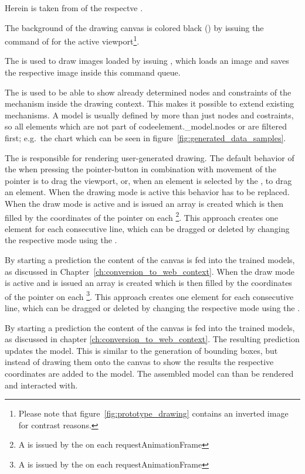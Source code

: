Herein  is taken from  of the respectve  .

The background of the drawing canvas is colored black () by issuing the  command of  for the active viewport\footnote{Please note that figure~\ref{fig:prototype_drawing} contains an inverted image for contrast reasons.}.

The  is used to draw images loaded by issuing , which loads an image and saves the respective image inside this command queue.

The  is used to be able to show already determined nodes and constraints of the mechanism inside the drawing context.
This makes it possible to extend existing mechanisms.
A  model is usually defined by more than just nodes and costraints, so all elements which are not part of code{element.\_model.nodes} or  are filtered first; e.g.\ the chart which can be seen in figure~\ref{fig:generated_data_samples}.

The  is responsible for rendering user-generated drawing.
The default behavior of the  when pressing the pointer-button in combination with movement of the pointer is to drag the viewport, or, when an element is selected by the , to drag an element.
When the drawing mode is active this behavior has to be replaced.
When the draw mode is active and  is issued an array is created which is then filled by the coordinates of the pointer on each \footnote{A  is issued by the  on each requestAnimationFrame}.
This approach creates one  element for each consecutive line, which can be dragged or deleted by changing the respective mode using the  .

By starting a prediction the content of the canvas is fed into the trained models, as discussed in Chapter~\ref{ch:conversion_to_web_context}.
When the draw mode is active and  is issued an array is created which is then filled by the coordinates of the pointer on each \footnote{A  is issued by the  on each requestAnimationFrame}.
This approach creates one  element for each consecutive line, which can be dragged or deleted by changing the respective mode using the  .

By starting a prediction the content of the canvas is fed into the trained models, as discussed in chapter \ref{ch:conversion_to_web_context}.
The resulting prediction updates the  model.
This is similar to the generation of bounding boxes, but instead of drawing them onto the canvas to show the results the respective coordinates are added to the  model.
The assembled  model can than be rendered and interacted with.

